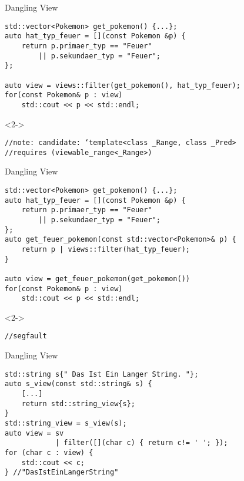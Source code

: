\begin{frame}[fragile]{Dangling View}
    \begin{overlayarea}{\linewidth}{6cm}
        \begin{verbatim}
std::vector<Pokemon> get_pokemon() {...};
auto hat_typ_feuer = [](const Pokemon &p) { 
    return p.primaer_typ == "Feuer"
        || p.sekundaer_typ = "Feuer";
};

auto view = views::filter(get_pokemon(), hat_typ_feuer);
for(const Pokemon& p : view)
    std::cout << p << std::endl;
    \end{verbatim}
        \begin{onlyenv}<2->
            \begin{verbatim}
//note: candidate: ‘template<class _Range, class _Pred>
//requires (viewable_range<_Range>)
            \end{verbatim}
        \end{onlyenv}
    \end{overlayarea}
\end{frame}


\begin{frame}[fragile]{Dangling View}
    \begin{overlayarea}{\linewidth}{6cm}
        \begin{verbatim}
std::vector<Pokemon> get_pokemon() {...};
auto hat_typ_feuer = [](const Pokemon &p) {
    return p.primaer_typ == "Feuer"
        || p.sekundaer_typ = "Feuer";
};
auto get_feuer_pokemon(const std::vector<Pokemon>& p) {
    return p | views::filter(hat_typ_feuer);
}
    
auto view = get_feuer_pokemon(get_pokemon())
for(const Pokemon& p : view)
    std::cout << p << std::endl;
        \end{verbatim}
        \begin{onlyenv}<2->
            \begin{verbatim}
//segfault
            \end{verbatim}
        \end{onlyenv}
    \end{overlayarea}
\end{frame}


\begin{frame}[fragile]{Dangling View}
    \begin{verbatim}
std::string s{" Das Ist Ein Langer String. "};
auto s_view(const std::string& s) {
    [...]
    return std::string_view{s};
}
std::string_view = s_view(s);
auto view = sv
            | filter([](char c) { return c!= ' '; });
for (char c : view) {
    std::cout << c;
} //"DasIstEinLangerString"
    \end{verbatim}
\end{frame}

